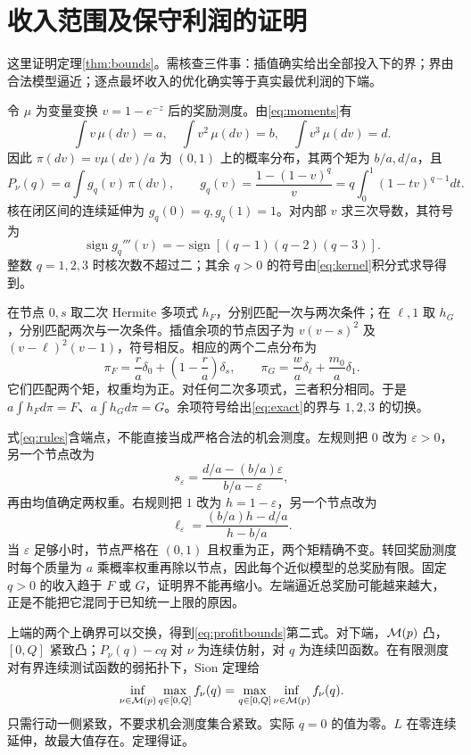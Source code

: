 \section{收入范围及保守利润的证明}\label{app:bounds}
这里证明定理\ref{thm:bounds}。需核查三件事：插值确实给出全部投入下的界；界由合法模型逼近；逐点最坏收入的优化确实等于真实最优利润的下端。

令 $\mu$ 为变量变换 $v=1-e^{-z}$ 后的奖励测度。由\eqref{eq:moments}有
\[
 \int v\,\mu(dv)=a,\quad \int v^2\,\mu(dv)=b,
 \quad \int v^3\,\mu(dv)=d.
\]
因此 $\pi(dv)=v\mu(dv)/a$ 为 $(0,1)$ 上的概率分布，其两个矩为 $b/a,d/a$，且
\begin{equation}\label{eq:kernel}
 P_\nu(q)=a\int g_q(v)\,\pi(dv),\qquad
 g_q(v)=\frac{1-(1-v)^q}{v}=q\int_0^1(1-tv)^{q-1}dt.
\end{equation}
核在闭区间的连续延伸为 $g_q(0)=q,g_q(1)=1$。对内部 $v$ 求三次导数，其符号为
\[
 \operatorname{sign}g_q'''(v)
 =-\operatorname{sign}[(q-1)(q-2)(q-3)].
\]
整数 $q=1,2,3$ 时核次数不超过二；其余 $q>0$ 的符号由\eqref{eq:kernel}积分式求导得到。

在节点 $0,s$ 取二次 Hermite 多项式 $h_F$，分别匹配一次与两次条件；在 $\ell,1$ 取 $h_G$，分别匹配两次与一次条件。插值余项的节点因子为 $v(v-s)^2$ 及 $(v-\ell)^2(v-1)$，符号相反。相应的两个二点分布为
\begin{equation}\label{eq:rules}
 \pi_F=\frac ra\delta_0+\left(1-\frac ra\right)\delta_s,
 \qquad
 \pi_G=\frac wa\delta_\ell+\frac{m_0}a\delta_1.
\end{equation}
它们匹配两个矩，权重均为正。对任何二次多项式，三者积分相同。于是 $a\int h_Fd\pi=F$、$a\int h_Gd\pi=G$。余项符号给出\eqref{eq:exact}的界与 $1,2,3$ 的切换。

式\eqref{eq:rules}含端点，不能直接当成严格合法的机会测度。左规则把 $0$ 改为 $\varepsilon>0$，另一个节点改为
\[
 s_\varepsilon=\frac{d/a-(b/a)\varepsilon}{b/a-\varepsilon},
\]
再由均值确定两权重。右规则把 $1$ 改为 $h=1-\varepsilon$，另一个节点改为
\[
 \ell_\varepsilon=\frac{(b/a)h-d/a}{h-b/a}.
\]
当 $\varepsilon$ 足够小时，节点严格在 $(0,1)$ 且权重为正，两个矩精确不变。转回奖励测度时每个质量为 $a$ 乘概率权重再除以节点，因此每个近似模型的总奖励有限。固定 $q>0$ 的收入趋于 $F$ 或 $G$，证明界不能再缩小。左端逼近总奖励可能越来越大，正是不能把它混同于已知统一上限的原因。

上端的两个上确界可以交换，得到\eqref{eq:profitbounds}第二式。对下端，$\mathcal M(p)$ 凸，$[0,Q]$ 紧致凸；$P_\nu(q)-cq$ 对 $\nu$ 为连续仿射，对 $q$ 为连续凹函数。在有限测度对有界连续测试函数的弱拓扑下，Sion 定理给
\[
 \inf_{\nu\in\mathcal M(p)}\max_{q\in[0,Q]}f_\nu(q)
 =\max_{q\in[0,Q]}\inf_{\nu\in\mathcal M(p)}f_\nu(q).
\]
只需行动一侧紧致，不要求机会测度集合紧致。实际 $q=0$ 的值为零。$L$ 在零连续延伸，故最大值存在。定理得证。

